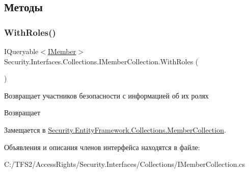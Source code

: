 \subsection{Методы}
\mbox{\label{interface_security_1_1_interfaces_1_1_collections_1_1_i_member_collection_a3252217f6eba5387ead1faff427bb43a}} 
\subsubsection{\texorpdfstring{With\+Roles()}{WithRoles()}}
{\footnotesize\ttfamily I\+Queryable$<$\hyperlink{interface_security_1_1_interfaces_1_1_model_1_1_i_member}{I\+Member}$>$ Security.\+Interfaces.\+Collections.\+I\+Member\+Collection.\+With\+Roles (\begin{DoxyParamCaption}{ }\end{DoxyParamCaption})}



Возвращает участников безопасности с информацией об их ролях 

\begin{DoxyReturn}{Возвращает}

\end{DoxyReturn}


Замещается в \hyperlink{class_security_1_1_entity_framework_1_1_collections_1_1_member_collection_a64f05448c3237c110809d01105b8731c}{Security.\+Entity\+Framework.\+Collections.\+Member\+Collection}.



Объявления и описания членов интерфейса находятся в файле\+:\begin{DoxyCompactItemize}
\item 
C\+:/\+T\+F\+S2/\+Access\+Rights/\+Security.\+Interfaces/\+Collections/I\+Member\+Collection.\+cs\end{DoxyCompactItemize}
